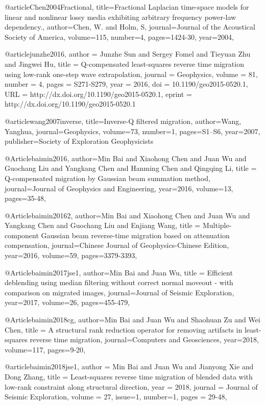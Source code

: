 @article{Chen2004Fractional,
  title={Fractional Laplacian time-space models for linear and nonlinear lossy media exhibiting arbitrary frequency power-law dependency.},
  author={Chen, W. and Holm, S},
  journal={Journal of the Acoustical Society of America},
  volume={115},
  number={4},
  pages={1424-30},
  year={2004},
}

@article{junzhe2016,
author = {Junzhe Sun and Sergey Fomel and Tieyuan Zhu and Jingwei Hu},
title = {Q-compensated least-squares reverse time migration using low-rank one-step wave extrapolation},
journal = {Geophysics},
volume = {81},
number = {4},
pages = {S271-S279},
year = {2016},
doi = {10.1190/geo2015-0520.1},
URL = {http://dx.doi.org/10.1190/geo2015-0520.1},
eprint = {http://dx.doi.org/10.1190/geo2015-0520.1}
}

@article{wang2007inverse,
  title={Inverse-{Q} filtered migration},
  author={Wang, Yanghua},
  journal={Geophysics},
  volume={73},
  number={1},
  pages={S1--S6},
  year={2007},
  publisher={Society of Exploration Geophysicists}
}

@Article{baimin2016,
  author={Min Bai and Xiaohong Chen and Juan Wu and Guochang Liu and Yangkang Chen and Hanming Chen and Qingqing Li},
  title = {Q-compensated migration by Gaussian beam summation method},
  journal={Journal of Geophysics and Engineering},
  year=2016,
  volume=13,
  pages={35-48},
}

@Article{baimin20162,
  author={Min Bai and Xiaohong Chen and Juan Wu and Yangkang Chen and Guochang Liu and  Enjiang Wang},
  title = {Multiple-component Gaussian beam reverse-time migration based on attenuation compensation},
  journal={Chinese Journal of Geophysics-Chinese Edition},
  year=2016,
  volume=59,
  pages={3379-3393},
}

@Article{baimin2017jse1,
  author={Min Bai and Juan Wu},
  title = {Efficient deblending using median filtering without correct normal moveout - with comparison on migrated images},
  journal={Journal of Seismic Exploration},
  year=2017,
  volume=26,
  pages={455-479},
}

@Article{baimin2018cg,
  author={Min Bai and Juan Wu and Shaohuan Zu and Wei Chen},
  title = {A structural rank reduction operator for removing artifacts in least-squares reverse time migration},
  journal={Computers and Geosciences},
  year=2018,
  volume=117,
  pages={9-20},
}

@article{baimin2018jse1,
  author =	 {Min Bai and Juan Wu and Jianyong Xie and Dong Zhang},
  title =	 {Least-squares reverse time migration of blended data with low-rank constraint along structural direction},
  year =	 2018,
  journal =	 {Journal of Seismic Exploration},
  volume =	 27,
  issue=1,
  number=1,
  pages =	 {29-48},
}

